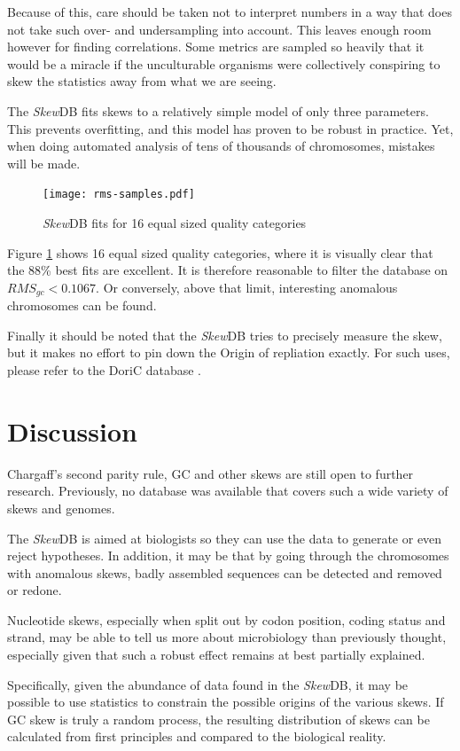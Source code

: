 \documentclass[9pt,twocolumn,twoside]{pnas-new}
\begin{document}
Because of this, care should be taken not to interpret numbers in a way that does not take such over- and undersampling into account. This leaves enough room however for finding correlations. Some metrics are sampled so heavily that it would be a miracle if the unculturable organisms were collectively conspiring to skew the statistics away from what we are seeing.

The \emph{Skew}DB fits skews to a relatively simple model of only three parameters. This prevents overfitting, and this model has proven to be robust in practice. Yet, when doing automated analysis of tens of thousands of chromosomes, mistakes will be made. 

\begin{figure}[tbhp]
\centering
\texttt{[image: rms-samples.pdf]}
\caption{\emph{Skew}DB fits for 16 equal sized quality categories}
\label{fig:rms-samples}
\end{figure}

Figure \ref{fig:rms-samples} shows 16 equal sized quality categories, where it is visually clear that the 88\% best fits are excellent. It is therefore reasonable to filter the database on $RMS_{gc}<0.1067$. Or conversely, above that limit, interesting anomalous chromosomes can be found.

Finally it should be noted that the \emph{Skew}DB tries to precisely measure the skew, but it makes no effort to pin down the Origin of repliation exactly. For such uses, please refer to the DoriC database \cite{luo_doric_2019}.
\section*{Discussion}
Chargaff's second parity rule, GC and other skews are still open to further research. Previously, no database was available that covers such a wide variety of skews and genomes.

The \emph{Skew}DB is aimed at biologists so they can use the data to generate or even reject hypotheses. In addition, it may be that by going through the chromosomes with anomalous skews, badly assembled sequences can be detected and removed or redone.

Nucleotide skews, especially when split out by codon position, coding status and strand, may be able to tell us more about microbiology than previously thought, especially given that such a robust effect remains at best partially explained.

Specifically, given the abundance of data found in the \emph{Skew}DB, it may be possible to use statistics to constrain the possible origins of the various skews. If GC skew is truly a random process, the resulting distribution of skews can be calculated from first principles and compared to the biological reality.
\end{document}
